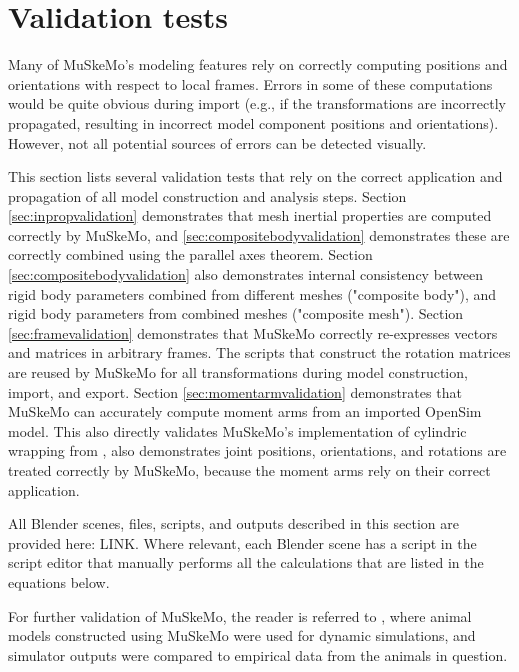 \documentclass{article}
\begin{document}
\section{Validation tests}

Many of MuSkeMo's modeling features rely on correctly computing positions and orientations with respect to local frames. Errors in some of these computations would be quite obvious during import (e.g., if the transformations are incorrectly propagated, resulting in incorrect model component positions and orientations). However, not all potential sources of errors can be detected visually. 

This section lists several validation tests that rely on the correct application and propagation of all model construction and analysis steps. Section \ref{sec:inpropvalidation} demonstrates that mesh inertial properties are computed correctly by MuSkeMo, and \ref{sec:compositebodyvalidation} demonstrates these are correctly combined using the parallel axes theorem. Section \ref{sec:compositebodyvalidation} also demonstrates internal consistency between rigid body parameters combined from different meshes ("composite body"), and rigid body parameters from combined meshes ("composite mesh"). Section \ref{sec:framevalidation} demonstrates that MuSkeMo correctly re-expresses vectors and matrices in arbitrary frames. The scripts that construct the rotation matrices are reused by MuSkeMo for all transformations during model construction, import, and export. Section \ref{sec:momentarmvalidation} demonstrates that MuSkeMo can accurately compute moment arms from an imported OpenSim model. This also directly validates MuSkeMo's implementation of cylindric wrapping from \cite{garnerObstacleSetMethodRepresenting2000}, also demonstrates joint positions, orientations, and rotations are treated correctly by MuSkeMo, because the moment arms rely on their correct application.

All Blender scenes, files, scripts, and outputs described in this section are provided here: LINK. Where relevant, each Blender scene has a script in the script editor that manually performs all the calculations that are listed in the equations below.

For further validation of MuSkeMo, the reader is referred to \cite{vanbijlertMusclecontrolledPhysicsSimulations2024a,vanbijlertMuscleDrivenPredictivePhysics2024}, where animal models constructed using MuSkeMo were used for dynamic simulations, and simulator outputs were compared to empirical data from the animals in question.
\end{document}
